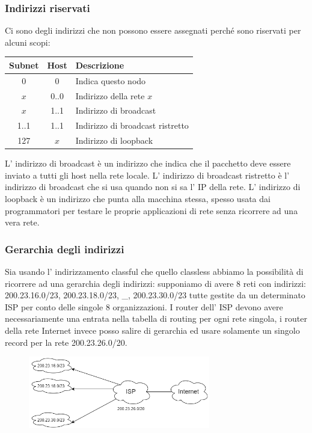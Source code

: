\subsubsection{Indirizzi riservati}
Ci sono degli indirizzi che non possono essere assegnati perché sono riservati per alcuni scopi:
\begin{table}[H]
    \centering
    \begin{tabular}{c|c|l}
        Subnet & Host & Descrizione \\
        \hline
        0 & 0 & Indica questo nodo \\
        $x$ & 0..0 & Indirizzo della rete $x$ \\
        $x$ & 1..1 & Indirizzo di broadcast \\
        1..1 & 1..1 & Indirizzo di broadcast ristretto \\
        127 & $x$ & Indirizzo di loopback \\
    \end{tabular}
\end{table}
L' indirizzo di broadcast è un indirizzo che indica che il pacchetto deve essere inviato a tutti gli host nella rete locale.
L' indirizzo di broadcast ristretto è l' indirizzo di broadcast che si usa quando non si sa l' IP della rete.
L' indirizzo di loopback è un indirizzo che punta alla macchina stessa, spesso usata dai programmatori per testare le proprie applicazioni di rete senza ricorrere ad una vera rete.


\subsubsection{Gerarchia degli indirizzi}
Sia usando l' indirizzamento classful che quello classless abbiamo la possibilità di ricorrere ad una gerarchia degli indirizzi: supponiamo di avere 8 reti con indirizzi: 200.23.16.0/23, 200.23.18.0/23, \_, 200.23.30.0/23 tutte gestite da un determinato ISP per conto delle singole 8 organizzazioni.
I router dell' ISP devono avere necessariamente una entrata nella tabella di routing per ogni rete singola, i router della rete Internet invece posso salire di gerarchia ed usare solamente un singolo record per la rete 200.23.26.0/20.
\begin{figure}[H]
    \centering
    \includegraphics[width=300px]{images/5_Internetworking/hierarchical_addressing.png}
\end{figure}


